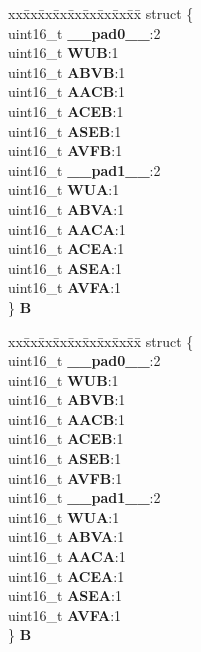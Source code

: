 \begin{DoxyCompactItemize}
\begin{tabbing}
\end{tabbing}\item 
\mbox{\label{unionuPSR3_a6737c79c8bdda2a3fdf90e967fc86fe0}} 
\begin{tabbing}
xx\=xx\=xx\=xx\=xx\=xx\=xx\=xx\=xx\=\kill
struct \{\\
\>uint16\_t {\bfseries \_\_pad0\_\_}:2\\
\>uint16\_t {\bfseries WUB}:1\\
\>uint16\_t {\bfseries ABVB}:1\\
\>uint16\_t {\bfseries AACB}:1\\
\>uint16\_t {\bfseries ACEB}:1\\
\>uint16\_t {\bfseries ASEB}:1\\
\>uint16\_t {\bfseries AVFB}:1\\
\>uint16\_t {\bfseries \_\_pad1\_\_}:2\\
\>uint16\_t {\bfseries WUA}:1\\
\>uint16\_t {\bfseries ABVA}:1\\
\>uint16\_t {\bfseries AACA}:1\\
\>uint16\_t {\bfseries ACEA}:1\\
\>uint16\_t {\bfseries ASEA}:1\\
\>uint16\_t {\bfseries AVFA}:1\\
\} {\bfseries B}\\

\end{tabbing}\item 
\mbox{\label{unionuPSR3_a6bca3fc6a7aabf6534b50349443fb881}} 
\begin{tabbing}
xx\=xx\=xx\=xx\=xx\=xx\=xx\=xx\=xx\=\kill
struct \{\\
\>uint16\_t {\bfseries \_\_pad0\_\_}:2\\
\>uint16\_t {\bfseries WUB}:1\\
\>uint16\_t {\bfseries ABVB}:1\\
\>uint16\_t {\bfseries AACB}:1\\
\>uint16\_t {\bfseries ACEB}:1\\
\>uint16\_t {\bfseries ASEB}:1\\
\>uint16\_t {\bfseries AVFB}:1\\
\>uint16\_t {\bfseries \_\_pad1\_\_}:2\\
\>uint16\_t {\bfseries WUA}:1\\
\>uint16\_t {\bfseries ABVA}:1\\
\>uint16\_t {\bfseries AACA}:1\\
\>uint16\_t {\bfseries ACEA}:1\\
\>uint16\_t {\bfseries ASEA}:1\\
\>uint16\_t {\bfseries AVFA}:1\\
\} {\bfseries B}\\


\end{tabbing}
\end{DoxyCompactItemize}
